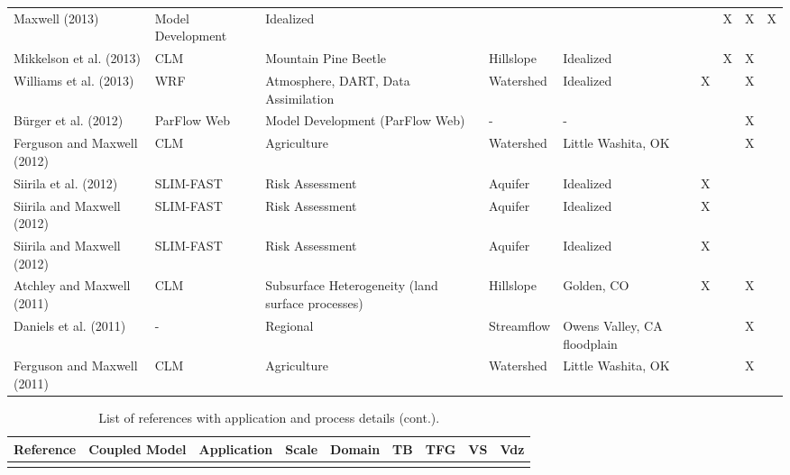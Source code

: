 {\begin{table}
\begin{tabular}{ l  p{1.5cm} p{2cm} p{1.5cm} p{1.5cm} | c | c | c | c }
\cite{M13} Maxwell (2013) & Model Development & Idealized &   &   &   & X & X & X   \\
\cite{Mikkelson13} Mikkelson et al. (2013) & CLM & Mountain Pine Beetle & Hillslope & Idealized &   & X & X &     \\
\cite{Williams13} Williams et al. (2013) & WRF & Atmosphere, DART, Data Assimilation & Watershed & Idealized & X &   & X &     \\
\cite{Burger12} B{\"u}rger et al. (2012) & ParFlow Web & Model Development (ParFlow Web)& - & - &   &   & X &     \\
\cite{Ferg12} Ferguson and Maxwell (2012) & CLM & Agriculture & Watershed & Little Washita, OK  &   &   & X &     \\
\cite{SNSMM10} Siirila et al. (2012) & SLIM-FAST & Risk Assessment & Aquifer & Idealized  & X &   &   &     \\
\cite{Siirila12a} Siirila and Maxwell (2012) & SLIM-FAST & Risk Assessment & Aquifer & Idealized  & X &   &   &     \\
\cite{Siirila12b} Siirila and Maxwell (2012) & SLIM-FAST & Risk Assessment & Aquifer & Idealized  & X &   &   &     \\
\cite{AM10} Atchley and Maxwell (2011) & CLM & Subsurface Heterogeneity (land surface processes) & Hillslope & Golden, CO  & X &   & X &     \\
\cite{DMC10} Daniels et al. (2011) & - & Regional & Streamflow & Owens Valley, CA floodplain  &   &   & X &     \\
\cite{Ferg11} Ferguson and Maxwell (2011) & CLM & Agriculture & Watershed & Little Washita, OK  &   &   & X &     \\

\end{tabular}
\label{pfref4}
\end{table}


\begin{table} \center
\renewcommand{\arraystretch}{2.5}
\center
\caption{List of \parflow{} references with application and process details (cont.).}
\begin{tabular}{ l  p{1.5cm} p{2cm} p{1.5cm} p{1.5cm} | c | c | c | c }
\bf{Reference} & \bf{Coupled Model} & \bf{Application} & \bf{Scale} & \bf{Domain} & \bf{TB} & \bf{TFG} & \bf{VS} & \bf{Vdz} \\ 
\hline{}



\end{tabular}
\end{table}}
